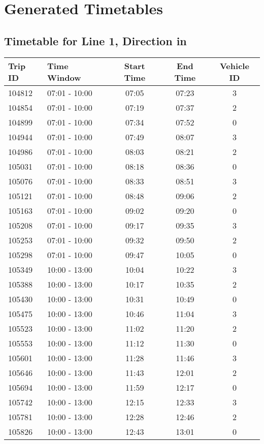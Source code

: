 \documentclass{article}
\begin{document}
            \section*{Generated Timetables}
            \subsection*{Timetable for Line 1, Direction in}
\begin{tabular}{llccc}
\toprule
Trip ID & Time Window & Start Time & End Time & Vehicle ID \\
\midrule
104812 & 07:01 - 10:00 & 07:05 & 07:23 & 3 \\
104854 & 07:01 - 10:00 & 07:19 & 07:37 & 2 \\
104899 & 07:01 - 10:00 & 07:34 & 07:52 & 0 \\
104944 & 07:01 - 10:00 & 07:49 & 08:07 & 3 \\
104986 & 07:01 - 10:00 & 08:03 & 08:21 & 2 \\
105031 & 07:01 - 10:00 & 08:18 & 08:36 & 0 \\
105076 & 07:01 - 10:00 & 08:33 & 08:51 & 3 \\
105121 & 07:01 - 10:00 & 08:48 & 09:06 & 2 \\
105163 & 07:01 - 10:00 & 09:02 & 09:20 & 0 \\
105208 & 07:01 - 10:00 & 09:17 & 09:35 & 3 \\
105253 & 07:01 - 10:00 & 09:32 & 09:50 & 2 \\
105298 & 07:01 - 10:00 & 09:47 & 10:05 & 0 \\
105349 & 10:00 - 13:00 & 10:04 & 10:22 & 3 \\
105388 & 10:00 - 13:00 & 10:17 & 10:35 & 2 \\
105430 & 10:00 - 13:00 & 10:31 & 10:49 & 0 \\
105475 & 10:00 - 13:00 & 10:46 & 11:04 & 3 \\
105523 & 10:00 - 13:00 & 11:02 & 11:20 & 2 \\
105553 & 10:00 - 13:00 & 11:12 & 11:30 & 0 \\
105601 & 10:00 - 13:00 & 11:28 & 11:46 & 3 \\
105646 & 10:00 - 13:00 & 11:43 & 12:01 & 2 \\
105694 & 10:00 - 13:00 & 11:59 & 12:17 & 0 \\
105742 & 10:00 - 13:00 & 12:15 & 12:33 & 3 \\
105781 & 10:00 - 13:00 & 12:28 & 12:46 & 2 \\
105826 & 10:00 - 13:00 & 12:43 & 13:01 & 0 \\

\end{tabular}
\end{document}
